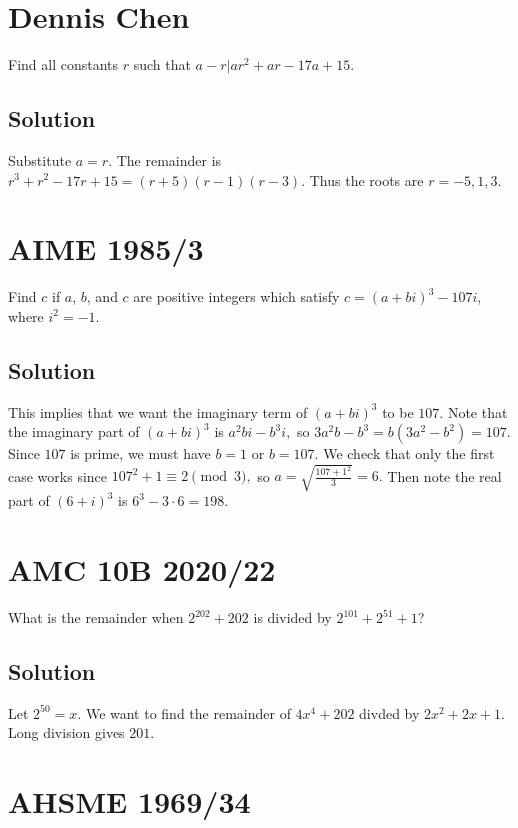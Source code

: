 \documentclass{article}
\begin{document}
\pagebreak\section{Dennis Chen}

Find all constants $r$ such that $a-r|ar^2+ar-17a+15.$

\subsection{Solution}

Substitute $a=r.$ The remainder is $r^3+r^2-17r+15=(r+5)(r-1)(r-3).$ Thus the roots are $r=-5,1,3.$

\pagebreak\section{AIME 1985/3}

Find $c$ if $a$, $b$, and $c$ are positive integers which satisfy $c=(a + bi)^3 - 107i$, where $i^2 = -1$.

\subsection{Solution}

This implies that we want the imaginary term of $(a+bi)^3$ to be $107.$ Note that the imaginary part of $(a+bi)^3$ is $a^2bi-b^3i,$ so $3a^2b-b^3=b(3a^2-b^2)=107.$ Since $107$ is prime, we must have $b=1$ or $b=107.$ We check that only the first case works since $107^2+1\equiv 2\pmod{3},$ so $a=\sqrt{\frac{107+1^2}{3}}=6.$ Then note the real part of $(6+i)^3$ is $6^3-3\cdot 6=198.$

\pagebreak\section{AMC 10B 2020/22}

What is the remainder when $2^{202}+202$ is divided by $2^{101}+2^{51}+1$?

\subsection{Solution}

Let $2^{50}=x.$ We want to find the remainder of $4x^4+202$ divded by $2x^2+2x+1.$ Long division gives $201.$

\pagebreak\section{AHSME 1969/34}
\end{document}
